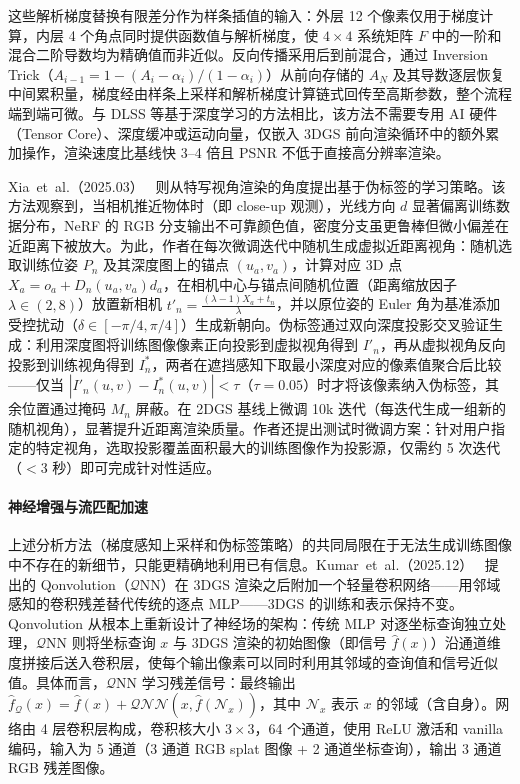 这些解析梯度替换有限差分作为样条插值的输入：外层 12 个像素仅用于梯度计算，内层 4 个角点同时提供函数值与解析梯度，使 $4{\times}4$ 系统矩阵 $F$ 中的一阶和混合二阶导数均为精确值而非近似。反向传播采用后到前混合，通过 Inversion Trick（$A_{i-1} = 1 - (A_i - \alpha_i) / (1{-}\alpha_i)$）从前向存储的 $A_N$ 及其导数逐层恢复中间累积量，梯度经由样条上采样和解析梯度计算链式回传至高斯参数，整个流程端到端可微。与 DLSS 等基于深度学习的方法相比，该方法不需要专用 AI 硬件（Tensor Core）、深度缓冲或运动向量，仅嵌入 3DGS 前向渲染循环中的额外累加操作，渲染速度比基线快 3--4 倍且 PSNR 不低于直接高分辨率渲染。

Xia~et~al.（2025.03）~\cite{2503_15908} 则从特写视角渲染的角度提出基于伪标签的学习策略。该方法观察到，当相机推近物体时（即 close-up 观测），光线方向 $d$ 显著偏离训练数据分布，NeRF 的 RGB 分支输出不可靠颜色值，密度分支虽更鲁棒但微小偏差在近距离下被放大。为此，作者在每次微调迭代中随机生成虚拟近距离视角：随机选取训练位姿 $P_n$ 及其深度图上的锚点 $(u_a, v_a)$，计算对应 3D 点 $X_a = o_a + D_n(u_a,v_a) d_a$，在相机中心与锚点间随机位置（距离缩放因子 $\lambda \in (2,8)$）放置新相机 $t'_n = \frac{(\lambda{-}1)X_a + t_n}{\lambda}$，并以原位姿的 Euler 角为基准添加受控扰动（$\delta \in [-\pi/4, \pi/4]$）生成新朝向。伪标签通过双向深度投影交叉验证生成：利用深度图将训练图像像素正向投影到虚拟视角得到 $I'_n$，再从虚拟视角反向投影到训练视角得到 $I^*_n$，两者在遮挡感知下取最小深度对应的像素值聚合后比较——仅当 $|I'_n(u,v) - I^*_n(u,v)| < \tau$（$\tau{=}0.05$）时才将该像素纳入伪标签，其余位置通过掩码 $M_n$ 屏蔽。在 2DGS 基线上微调 10k 迭代（每迭代生成一组新的随机视角），显著提升近距离渲染质量。作者还提出测试时微调方案：针对用户指定的特定视角，选取投影覆盖面积最大的训练图像作为投影源，仅需约 5 次迭代（$<$3 秒）即可完成针对性适应。

\paragraph{神经增强与流匹配加速}

上述分析方法（梯度感知上采样和伪标签策略）的共同局限在于无法生成训练图像中不存在的新细节，只能更精确地利用已有信息。Kumar~et~al.（2025.12）~\cite{2512_12898} 提出的 Qonvolution（$\mathcal{Q}$NN）在 3DGS 渲染之后附加一个轻量卷积网络——用邻域感知的卷积残差替代传统的逐点 MLP——3DGS 的训练和表示保持不变。Qonvolution 从根本上重新设计了神经场的架构：传统 MLP 对逐坐标查询独立处理，$\mathcal{Q}$NN 则将坐标查询 $x$ 与 3DGS 渲染的初始图像（即信号 $\hat{f}(x)$）沿通道维度拼接后送入卷积层，使每个输出像素可以同时利用其邻域的查询值和信号近似值。具体而言，$\mathcal{Q}$NN 学习残差信号：最终输出 $\hat{f}_\mathcal{Q}(x) = \hat{f}(x) + \mathcal{Q}\!\mathcal{N}\!\mathcal{N}(x, \hat{f}(\mathcal{N}_x))$，其中 $\mathcal{N}_x$ 表示 $x$ 的邻域（含自身）。网络由 4 层卷积层构成，卷积核大小 $3{\times}3$，64 个通道，使用 ReLU 激活和 vanilla 编码，输入为 5 通道（3 通道 RGB splat 图像 + 2 通道坐标查询），输出 3 通道 RGB 残差图像。

